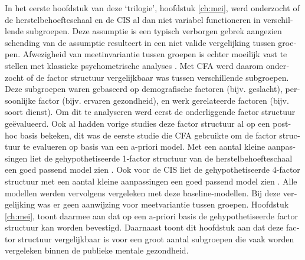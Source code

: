 \begin{otherlanguage}{dutch}
In het eerste hoofdstuk van deze `trilogie', hoofdstuk \ref{ch:mei}, werd onderzocht of de herstelbehoefteschaal en de CIS al dan niet variabel functioneren in verschillende subgroepen. Deze assumptie is een typisch verborgen gebrek aangezien schending van de assumptie resulteert in een niet valide vergelijking tussen groepen. Afwezigheid van meetinvariantie tussen groepen is echter moeilijk vast te stellen met klassieke psychometrische analyses \parencite{Vandenberg_2000,Millsap_2011}. Met CFA werd daarom onderzocht of de factor structuur vergelijkbaar was tussen verschillende subgroepen. Deze subgroepen waren gebaseerd op demografische factoren (bijv. geslacht), persoonlijke factor (bijv. ervaren gezondheid), en werk gerelateerde factoren (bijv. soort dienst). Om dit te analyseren werd eerst de onderliggende factor structuur ge\"evalueerd. Ook al hadden vorige studies deze factor structuur al op een post-hoc basis bekeken, dit was de eerste studie die CFA gebruikte om de factor structuur te evalueren op basis van een a-priori model. Met een aantal kleine aanpassingen liet de gehypothetiseerde 1-factor structuur van de herstelbehoefteschaal een goed passend model zien \parencite{Veldhoven_2008}. Ook voor de CIS liet de gehypothetiseerde 4-factor structuur met een aantal kleine aanpassingen een goed passend model zien \parencite{Janssen_2003}. Alle modellen werden vervolgens vergeleken met deze baseline-modellen. Bij deze vergelijking was er geen aanwijzing voor meetvariantie tussen groepen. Hoofdstuk \ref{ch:mei}, toont daarmee aan dat op een a-priori basis de gehypothetiseerde factor structuur kan worden bevestigd. Daarnaast toont dit hoofdstuk aan dat deze factor structuur vergelijkbaar is voor een groot aantal subgroepen die vaak worden vergeleken binnen de publieke mentale gezondheid.


\end{otherlanguage}
